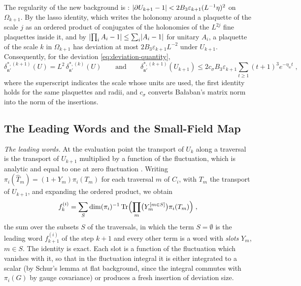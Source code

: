 \documentclass[11pt]{preprint}
\DeclarePairedDelimiter{\abs}{\lvert}{\rvert}
\numberwithin{equation}{section}
\theoremstyle{definition}
\theoremstyle{remark}
\theoremstyle{plain}
\begin{document}
The regularity of the new background is \cite[p.~268]{BalabanCRE}: $\abs{\partial U_{k+1} - 1} < 2B_3\varepsilon_{k+1}(L^{-1}\eta)^2$ on $\Omega_{k+1}$. By the lasso identity, which writes the holonomy around a plaquette of the scale $j$ as an ordered product of conjugates of the holonomies of the $L^{2j}$ fine plaquettes inside it, and by $\abs{\prod_iA_i - 1} \leq \sum_i\abs{A_i - 1}$ for unitary $A_i$, a plaquette of the scale $k$ in $\Omega_{k+1}$ has deviation at most $2B_3\varepsilon_{k+1}L^{-2}$ under $U_{k+1}$. Consequently, for the deviation \eqref{eq:deviation-quantity},
\begin{equation}\label{eq:deviation-scaling}
    \delta^{*,(k+1)}_{\mathfrak n'}(U) = L^2\,\delta^{*,(k)}_{\mathfrak n'}(U)
    \qquad\text{and}\qquad
    \delta^{*,(k+1)}_{\mathfrak n'}(U_{k+1}) \leq 2c_\sigma B_3\varepsilon_{k+1}\sum_{t \geq 1}(t + 1)^3e^{-\eta_wt}\;,
\end{equation}
where the superscript indicates the scale whose units are used, the first identity holds for the same plaquettes and radii, and $c_\sigma$ converts Ba{\l}aban's matrix norm into the norm of the insertions.

\subsection{The Leading Words and the Small-Field Map}\label{sec:small-field-map}

\emph{The leading words.} At the evaluation point the transport of $U_k$ along a traversal is the transport of $U_{k+1}$ multiplied by a function of the fluctuation, which is analytic and equal to one at zero fluctuation \cite[p.~265]{BalabanRG1}. Writing $\pi_i(\hat T_m) = (1 + Y_m)\pi_i(T_m)$ for each traversal $m$ of $C_i$, with $T_m$ the transport of $U_{k+1}$, and expanding the ordered product, we obtain
\begin{equation}\label{eq:slot-expansion}
    f^{(i)}_k = \sum_{S}\dim(\pi_i)^{-1}\operatorname{Tr}\Bigl(\prod_m\bigl(Y_m^{[m \in S]}\bigr)\pi_i(T_m)\Bigr)\;,
\end{equation}
the sum over the subsets $S$ of the traversals, in which the term $S = \emptyset$ is the leading word $f^{(i)}_{k+1}$ of the step $k + 1$ and every other term is a word with \emph{slots} $Y_m$, $m \in S$. The identity is exact. Each slot is a function of the fluctuation which vanishes with it, so that in the fluctuation integral it is either integrated to a scalar (by Schur's lemma at flat background, since the integral commutes with $\pi_i(G)$ by gauge covariance) or produces a fresh insertion of deviation size.
\end{document}
